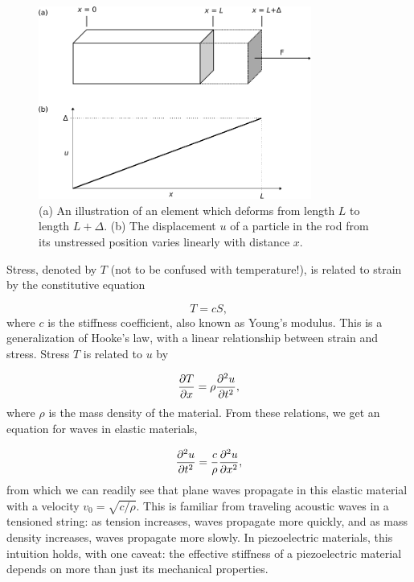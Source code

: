 \documentclass{beavtex_dub_edit}
\begin{document}
\begin{figure}
    \includegraphics[width = 0.8\textwidth]{displacement field.pdf}
    \caption{(a) An illustration of an element which deforms from length $L$ to length $L + \Delta$. (b) The displacement $u$ of a particle in the rod from its unstressed position varies linearly with distance $x$.} \label{dfield}
\end{figure}
Stress, denoted by $T$ (not to be confused with temperature!), is related to strain by the constitutive equation

\begin{equation}
    T = cS, \label{elastic Hooke's}
\end{equation}
where $c$ is the stiffness coefficient, also known as Young's modulus. This is a generalization of Hooke's law, with a linear relationship between strain and stress. Stress $T$ is related to $u$ by 

\begin{equation}
    \pdv{T}{x} = \rho \pdv[2]{u}{t}, \label{stress related to displacement}
\end{equation}
where $\rho$ is the mass density of the material. From these relations, we get an equation for waves in elastic materials,

\begin{equation}
    \pdv[2]{u}{t} = \frac{c}{\rho} \pdv[2]{u}{x},
\end{equation}
from which we can readily see that plane waves propagate in this elastic material with a velocity $v_0 = \sqrt{c/\rho}$. This is familiar from traveling acoustic waves in a tensioned string: as tension increases, waves propagate more quickly, and as mass density increases, waves propagate more slowly. In piezoelectric materials, this intuition holds, with one caveat: the effective stiffness of a piezoelectric material depends on more than just its mechanical properties.
\end{document}
